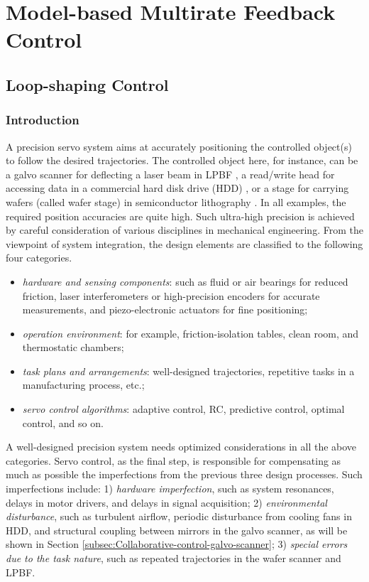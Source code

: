 \documentclass [11pt, proquest] {uwthesis}[2020/02/24]
\begin{document}

\part{Model-based Multirate Feedback Control} \label{part:Multirate-Feedback-Control}

 
\chapter{Loop-shaping Control} \label{chap:Loop-shaping-Control}

\section{Introduction}

A precision servo system aims at accurately positioning the controlled
object(s) to follow the desired trajectories. The controlled object
here, for instance, can be a galvo scanner for deflecting
a laser beam in LPBF \cite{wang2016spectral}, a read/write head for accessing data in
a commercial hard disk drive (HDD) \cite{atsumi2014compensating},
or a stage for carrying wafers (called wafer stage) in semiconductor
lithography \cite{oomen2014connecting}. In all examples, the required position accuracies
are quite high. Such ultra-high precision is achieved by careful
consideration of various disciplines in mechanical engineering. From
the viewpoint of system integration, the design elements are classified
to the following four categories.
\begin{itemize}
\item \emph{hardware and sensing components}: such as fluid or air bearings
for reduced friction, laser interferometers or high-precision encoders
for accurate measurements, and piezo-electronic actuators for fine
positioning;
\item \emph{operation environment}: for example, friction-isolation tables,
clean room, and thermostatic chambers;
\item \emph{task plans and arrangements}: well-designed trajectories, repetitive
tasks in a manufacturing process, etc.;
\item \emph{servo control algorithms}: adaptive control, RC,
predictive control, optimal control, and so on.
\end{itemize}
A well-designed precision system needs optimized considerations in
all the above categories. Servo control, as the final step, is responsible
for compensating as much as possible the imperfections from the previous
three design processes. Such imperfections include:\emph{ }1)\emph{
hardware imperfection}, such as system resonances, delays in motor
drivers, and delays in signal acquisition; 2)\emph{ environmental
disturbance}, such as turbulent airflow, periodic disturbance from
cooling fans in HDD, and structural coupling between mirrors in the
galvo scanner, as will be shown in Section \ref{subsec:Collaborative-control-galvo-scanner}; 3)\emph{ special errors due to the task nature}, such
as repeated trajectories in the wafer scanner and LPBF.
\end{document}
